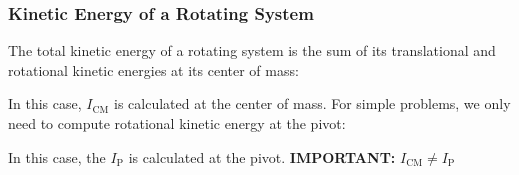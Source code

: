 \documentclass[12pt,compress,aspectratio=169]{beamer}
\newcommand{\mb}[1]{\ensuremath\mathbf{#1}}
\begin{document}
\begin{frame}
  \frametitle{Kinetic Energy of a Rotating System}
  The total kinetic energy of a rotating system is the sum of its translational
  and rotational kinetic energies at its center of mass:

  
  In this case, $I_\mathrm{CM}$ is calculated at the center of mass. For simple
  problems, we only need to compute rotational kinetic energy at the pivot:

  
  In this case, the $I_\mathrm{P}$ is calculated at the pivot.
  \textbf{IMPORTANT:} $I_\mathrm{CM}\neq I_\mathrm{P}$
\end{frame}
\end{document}

